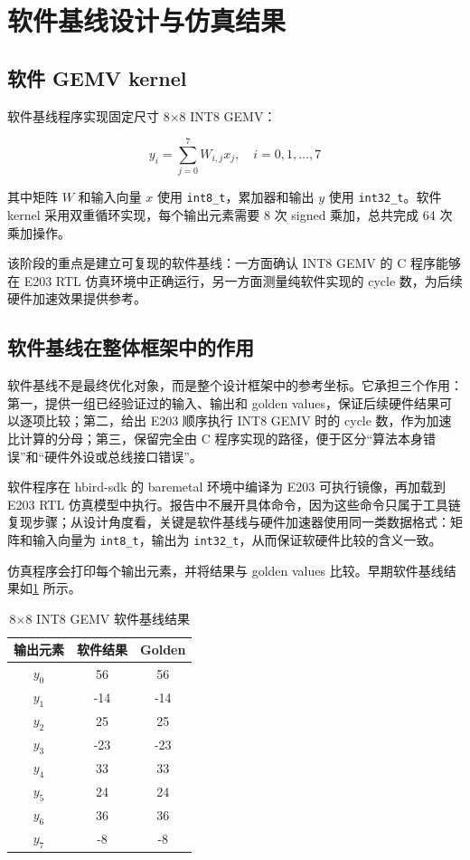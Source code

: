 \documentclass[12pt, a4paper]{article}
\begin{document}
\section{软件基线设计与仿真结果}

\subsection{软件 GEMV kernel}

软件基线程序实现固定尺寸 8$\times$8 INT8 GEMV：

\begin{equation}
    y_i = \sum_{j=0}^{7} W_{i,j} x_j,\quad i=0,1,\dots,7
\end{equation}

其中矩阵 $W$ 和输入向量 $x$ 使用 \texttt{int8\_t}，累加器和输出 $y$ 使用 \texttt{int32\_t}。软件 kernel 采用双重循环实现，每个输出元素需要 8 次 signed 乘加，总共完成 64 次乘加操作。

该阶段的重点是建立可复现的软件基线：一方面确认 INT8 GEMV 的 C 程序能够在 E203 RTL 仿真环境中正确运行，另一方面测量纯软件实现的 cycle 数，为后续硬件加速效果提供参考。

\subsection{软件基线在整体框架中的作用}

软件基线不是最终优化对象，而是整个设计框架中的参考坐标。它承担三个作用：第一，提供一组已经验证过的输入、输出和 golden values，保证后续硬件结果可以逐项比较；第二，给出 E203 顺序执行 INT8 GEMV 时的 cycle 数，作为加速比计算的分母；第三，保留完全由 C 程序实现的路径，便于区分“算法本身错误”和“硬件外设或总线接口错误”。

软件程序在 hbird-sdk 的 baremetal 环境中编译为 E203 可执行镜像，再加载到 E203 RTL 仿真模型中执行。报告中不展开具体命令，因为这些命令只属于工具链复现步骤；从设计角度看，关键是软件基线与硬件加速器使用同一类数据格式：矩阵和输入向量为 \texttt{int8\_t}，输出为 \texttt{int32\_t}，从而保证软硬件比较的含义一致。

仿真程序会打印每个输出元素，并将结果与 golden values 比较。早期软件基线结果如\cref{tab:sw-result} 所示。

\begin{table}[H]
    \centering
    \caption{8$\times$8 INT8 GEMV 软件基线结果}
    \label{tab:sw-result}
    \begin{tabular}{ccc}
        \toprule
        \textbf{输出元素} & \textbf{软件结果} & \textbf{Golden} \\
        \midrule
        $y_0$ & 56 & 56 \\
        $y_1$ & -14 & -14 \\
        $y_2$ & 25 & 25 \\
        $y_3$ & -23 & -23 \\
        $y_4$ & 33 & 33 \\
        $y_5$ & 24 & 24 \\
        $y_6$ & 36 & 36 \\
        $y_7$ & -8 & -8 \\
        \bottomrule
    \end{tabular}
\end{table}
\end{document}
